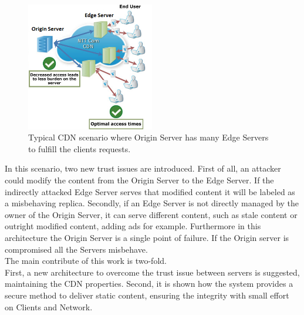 \documentclass[conference,compsoc]{IEEEtran}
\begin{document}
\begin{figure}[!t]
\centering
\includegraphics[width=2.2in]{images/cdn.png}

\caption{Typical CDN scenario where Origin Server has many Edge Servers to fulfill the clients requests.}
\label{fig:CDN}
\end{figure} 

In this scenario, two new trust issues are introduced. First of all, an attacker could modify the content from the Origin Server to the Edge Server. If the indirectly attacked Edge Server serves that modified content it will be labeled as a misbehaving replica. Secondly, if an Edge Server is not directly managed by the owner of the Origin Server, it can serve different content, such as stale content or outright modified content, adding ads for example.
Furthermore in this architecture the Origin Server is a single point of failure. If the Origin server is compromised all the Servers misbehave.\\
The main contribute of this work is two-fold.\\First, a new architecture to overcome the trust issue between servers is suggested, maintaining the CDN properties. Second, it is shown how the system provides a secure method to deliver static content, ensuring the integrity with small effort on Clients and Network. 
\end{document}
